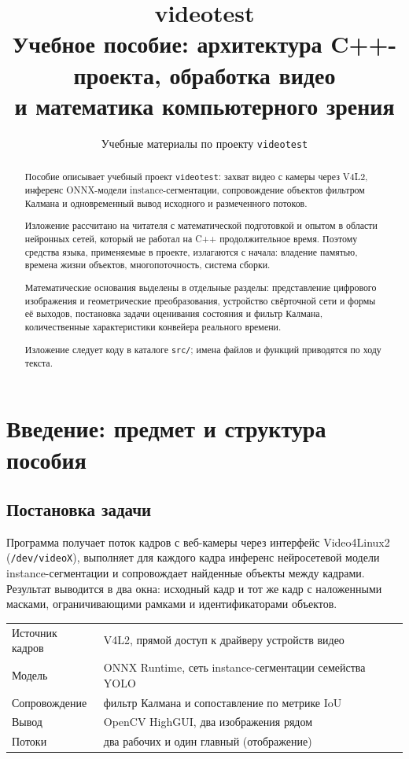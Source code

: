 \documentclass[11pt,a4paper]{article}
\title{\textbf{videotest}\\[2mm]
       \large Учебное пособие: архитектура C++-проекта, обработка видео\\
       и математика компьютерного зрения}
\author{Учебные материалы по проекту \texttt{videotest}}
\date{}
\theoremstyle{definition}
\theoremstyle{remark}
\begin{document}
\maketitle

\begin{abstract}
\noindent
Пособие описывает учебный проект \texttt{videotest}: захват видео с камеры
через V4L2, инференс ONNX-модели instance-сегментации, сопровождение объектов
фильтром Калмана и одновременный вывод исходного и размеченного потоков.

Изложение рассчитано на читателя с математической подготовкой и опытом в
области нейронных сетей, который не работал на C++ продолжительное время.
Поэтому средства языка, применяемые в проекте, излагаются с начала: владение
памятью, времена жизни объектов, многопоточность, система сборки.

Математические основания выделены в отдельные разделы: представление
цифрового изображения и геометрические преобразования, устройство свёрточной
сети и формы её выходов, постановка задачи оценивания состояния и фильтр
Калмана, количественные характеристики конвейера реального времени.

Изложение следует коду в каталоге \texttt{src/}; имена файлов и функций
приводятся по ходу текста.
\end{abstract}

\tableofcontents
\newpage

\section{Введение: предмет и структура пособия}

\subsection{Постановка задачи}

Программа получает поток кадров с веб-камеры через интерфейс Video4Linux2
(\texttt{/dev/videoX}), выполняет для каждого кадра инференс нейросетевой
модели instance-сегментации и сопровождает найденные объекты между кадрами.
Результат выводится в два окна: исходный кадр и тот же кадр с наложенными
масками, ограничивающими рамками и идентификаторами объектов.

\begin{center}
\begin{tabular}{ll}
\toprule
Источник кадров & V4L2, прямой доступ к драйверу устройств видео \\
Модель & ONNX Runtime, сеть instance-сегментации семейства YOLO \\
Сопровождение & фильтр Калмана и сопоставление по метрике IoU \\
Вывод & OpenCV HighGUI, два изображения рядом \\
Потоки & два рабочих и один главный (отображение) \\
\bottomrule
\end{tabular}
\end{center}
\end{document}
